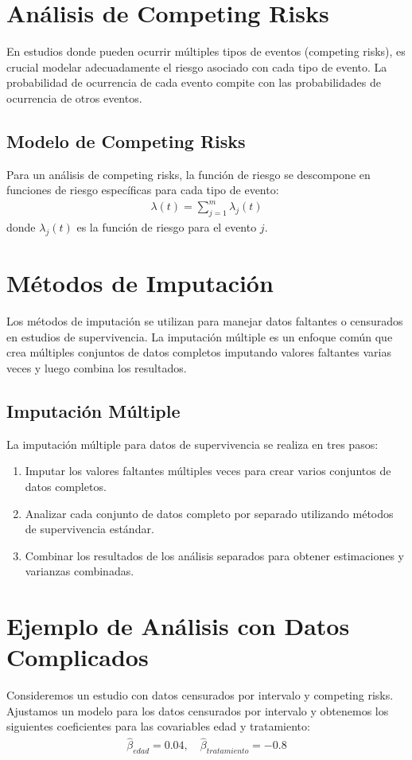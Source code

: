 \documentclass[a4paper]{report} %
\begin{document}
\section{An\'alisis de Competing Risks}
En estudios donde pueden ocurrir m\'ultiples tipos de eventos (competing risks), es crucial modelar adecuadamente el riesgo asociado con cada tipo de evento. La probabilidad de ocurrencia de cada evento compite con las probabilidades de ocurrencia de otros eventos.

\subsection{Modelo de Competing Risks}
Para un an\'alisis de competing risks, la funci\'on de riesgo se descompone en funciones de riesgo espec\'ificas para cada tipo de evento:
\begin{eqnarray*}
\lambda(t) = \sum_{j=1}^m \lambda_j(t)
\end{eqnarray*}
donde $\lambda_j(t)$ es la funci\'on de riesgo para el evento $j$.

\section{M\'etodos de Imputaci\'on}
Los m\'etodos de imputaci\'on se utilizan para manejar datos faltantes o censurados en estudios de supervivencia. La imputaci\'on m\'ultiple es un enfoque com\'un que crea m\'ultiples conjuntos de datos completos imputando valores faltantes varias veces y luego combina los resultados.

\subsection{Imputaci\'on M\'ultiple}
La imputaci\'on m\'ultiple para datos de supervivencia se realiza en tres pasos:
\begin{enumerate}
    \item Imputar los valores faltantes m\'ultiples veces para crear varios conjuntos de datos completos.
    \item Analizar cada conjunto de datos completo por separado utilizando m\'etodos de supervivencia est\'andar.
    \item Combinar los resultados de los an\'alisis separados para obtener estimaciones y varianzas combinadas.
\end{enumerate}

\section{Ejemplo de An\'alisis con Datos Complicados}
Consideremos un estudio con datos censurados por intervalo y competing risks. Ajustamos un modelo para los datos censurados por intervalo y obtenemos los siguientes coeficientes para las covariables edad y tratamiento:
\begin{eqnarray*}
\hat{\beta}_{edad} = 0.04, \quad \hat{\beta}_{tratamiento} = -0.8
\end{eqnarray*}
\end{document}
